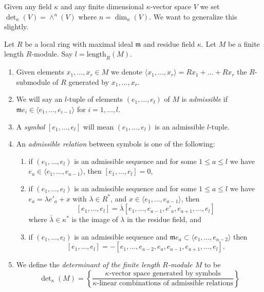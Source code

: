 \medskip\noindent
Given any field $\kappa$ and
any finite dimensional $\kappa$-vector space $V$ we set
$\det\nolimits_\kappa(V) = \wedge^n(V)$
where $n = \dim_\kappa(V)$. We want to generalize this slightly.

\begin{definition}
\label{definition-determinant}
Let $R$ be a local ring with maximal ideal $\mathfrak m$ and
residue field $\kappa$. Let $M$ be a finite length $R$-module.
Say $l = \text{length}_R(M)$.
\begin{enumerate}
\item Given elements $x_1, \ldots, x_r \in M$ we denote
$\langle x_1, \ldots, x_r \rangle = Rx_1 + \ldots + Rx_r$ the
$R$-submodule of $R$ generated by $x_1, \ldots, x_r$.
\item We will say an $l$-tuple of elements
$(e_1, \ldots, e_l)$ of $M$ is {\it admissible} if
$\mathfrak m e_i \in \langle e_1, \ldots, e_{i - 1} \rangle$
for $i = 1, \ldots, l$.
\item A {\it symbol} $[e_1, \ldots, e_l]$ will mean
$(e_1, \ldots, e_l)$ is an admissible $l$-tuple.
\item An {\it admissible relation} between symbols is one of the following:
\begin{enumerate}
\item if $(e_1, \ldots, e_l)$ is an admissible sequence and
for some $1 \leq a \leq l$ we have
$e_a \in \langle e_1, \ldots, e_{a - 1}\rangle$, then
$[e_1, \ldots, e_l] = 0$,
\item if $(e_1, \ldots, e_l)$ is an admissible sequence and
for some $1 \leq a \leq l$ we have $e_a = \lambda e'_a + x$
with $\lambda \in R^*$, and
$x \in \langle e_1, \ldots, e_{a - 1}\rangle$, then
$$
[e_1, \ldots, e_l] =
\overline{\lambda} [e_1, \ldots, e_{a - 1}, e'_a, e_{a + 1}, \ldots, e_l]
$$
where $\overline{\lambda} \in \kappa^*$ is the image of $\lambda$ in
the residue field, and
\item if $(e_1, \ldots, e_l)$ is an admissible sequence and
$\mathfrak m e_a \subset \langle e_1, \ldots, e_{a - 2}\rangle$ then
$$
[e_1, \ldots, e_l] =
- [e_1, \ldots, e_{a - 2}, e_a, e_{a - 1}, e_{a + 1}, \ldots, e_l].
$$
\end{enumerate}
\item
We define the {\it determinant of the finite length $R$-module $M$} to be
$$
\det\nolimits_\kappa(M) =
\left\{
\frac{\kappa\text{-vector space generated by symbols}}
{\kappa\text{-linear combinations of admissible relations}}
\right\}
$$
\end{enumerate}
\end{definition}

